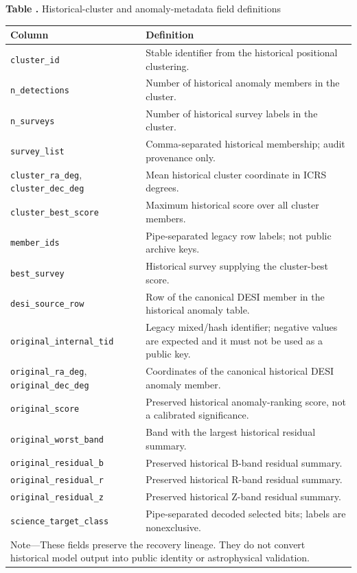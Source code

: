 \documentclass[twocolumn]{aastex701}
\begin{document}
\clearpage
{}\label{tab:history-fields}
\begin{center}
\textbf{Table \thetable.} Historical-cluster and anomaly-metadata field definitions

\smallskip
\scriptsize
\begin{tabular}{p{}p{}}
\toprule
Column & Definition \\
\midrule
\texttt{cluster\_id} & Stable identifier from the historical positional clustering. \\
\texttt{n\_detections} & Number of historical anomaly members in the cluster. \\
\texttt{n\_surveys} & Number of historical survey labels in the cluster. \\
\texttt{survey\_list} & Comma-separated historical membership; audit provenance only. \\
\texttt{cluster\_ra\_deg}, \texttt{cluster\_dec\_deg} & Mean historical cluster coordinate in ICRS degrees. \\
\texttt{cluster\_best\_score} & Maximum historical score over all cluster members. \\
\texttt{member\_ids} & Pipe-separated legacy row labels; not public archive keys. \\
\texttt{best\_survey} & Historical survey supplying the cluster-best score. \\
\texttt{desi\_source\_row} & Row of the canonical DESI member in the historical anomaly table. \\
\texttt{original\_internal\_tid} & Legacy mixed/hash identifier; negative values are expected and it must not be used as a public key. \\
\texttt{original\_ra\_deg}, \texttt{original\_dec\_deg} & Coordinates of the canonical historical DESI anomaly member. \\
\texttt{original\_score} & Preserved historical anomaly-ranking score, not a calibrated significance. \\
\texttt{original\_worst\_band} & Band with the largest historical residual summary. \\
\texttt{original\_residual\_b} & Preserved historical B-band residual summary. \\
\texttt{original\_residual\_r} & Preserved historical R-band residual summary. \\
\texttt{original\_residual\_z} & Preserved historical Z-band residual summary. \\
\texttt{science\_target\_class} & Pipe-separated decoded selected bits; labels are nonexclusive. \\
\bottomrule
\multicolumn{2}{p{0.93\textwidth}}{\footnotesize Note---These fields preserve the recovery
lineage. They do not convert historical model output into public identity or astrophysical
validation.}\\
\end{tabular}
\end{center}
\end{document}
